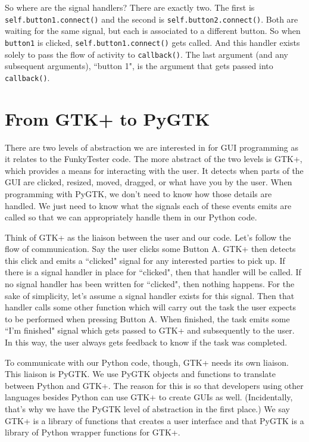 \documentclass{report}
\begin{document}
\begin{appendices}
So where are the signal handlers? There are exactly two. The first is \texttt{self.button1.connect()} and the second is \texttt{self.button2.connect()}. Both are waiting for the same signal, but each is associated to a different button. So when \texttt{button1} is clicked, \texttt{self.button1.connect()} gets called. And this handler exists solely to pass the flow of activity to \texttt{callback()}. The last argument (and any subsequent arguments), ``button 1", is the argument that gets passed into \texttt{callback()}.


\section{From GTK+ to PyGTK}
There are two levels of abstraction we are interested in for GUI programming as it relates to the FunkyTester code. The more abstract of the two levels is GTK+, which provides a means for interacting with the user. It detects when parts of the GUI are clicked, resized, moved, dragged, or what have you by the user. When programming with PyGTK, we don't need to know how those details are handled. We just need to know what the signals each of these events emits are called so that we can appropriately handle them in our Python code. 

Think of GTK+ as the liaison between the user and our code. Let's follow the flow of communication. Say the user clicks some Button A. GTK+ then detects this click and emits a ``clicked" signal for any interested parties to pick up. If there is a signal handler in place for ``clicked", then that handler will be called. If no signal handler has been written for ``clicked", then nothing happens. For the sake of simplicity, let's assume a signal handler exists for this signal. Then that handler calls some other function which will carry out the task the user expects to be performed when pressing Button A. When finished, the task emits some ``I'm finished" signal which gets passed to GTK+ and subsequently to the user. In this way, the user always gets feedback to know if the task was completed. 

To communicate with our Python code, though, GTK+ needs its own liaison. This liaison is PyGTK. We use PyGTK objects and functions to translate between Python and GTK+. The reason for this is so that developers using other languages besides Python can use GTK+ to create GUIs as well. (Incidentally, that's why we have the PyGTK level of abstraction in the first place.) We say GTK+ is a library of functions that creates a user interface and that PyGTK is a library of Python wrapper functions for GTK+.


\end{appendices}
\end{document}
